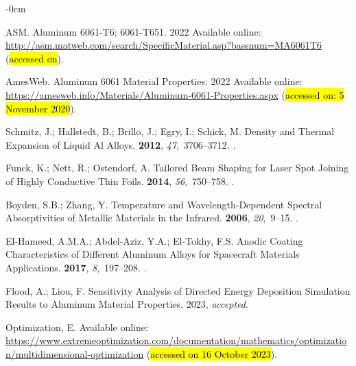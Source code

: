 \documentclass[metals,article,accept,pdftex,moreauthors]{Definitions/mdpi}
\begin{document}
\begin{adjustwidth}{-\extralength}{0cm}
\begin{thebibliography}{999}
ASM.
Aluminum 6061-{{T6}}; 6061-{{T651}}. 2022
Available online: \url{http://asm.matweb.com/search/SpecificMaterial.asp?bassnum=MA6061T6} (\hl{accessed on}).

AmesWeb.
Aluminum 6061 Material Properties. 2022
Available online: \url{https://amesweb.info/Materials/Aluminum-6061-Properties.aspx} (\hl{accessed on: 5 November 2020}).

Schmitz, J.; Hallstedt, B.; Brillo, J.; Egry, I.; Schick, M.
Density and Thermal Expansion of Liquid {{Al}} Alloys.
 {\bf 2012}, {\em 47},~3706--3712.
.

Funck, K.; Nett, R.; Ostendorf, A.
\newblock Tailored {{Beam Shaping}} for {{Laser Spot Joining}} of {{Highly
  Conductive Thin Foils}}.
 {\bf 2014}, {\em 56},~750--758.
.

Boyden, S.B.; Zhang, Y.
\newblock Temperature and {{Wavelength-Dependent Spectral Absorptivities}} of
  {{Metallic Materials}} in the {{Infrared}}.
 {\bf 2006}, {\em
  20},~9--15.
.

{El-Hameed}, A.M.A.; {Abdel-Aziz}, Y.A.; {El-Tokhy}, F.S.
\newblock Anodic {{Coating Characteristics}} of {{Different Aluminum Alloys}}
  for {{Spacecraft Materials Applications}}.
 {\bf 2017}, {\em 8},~197--208.
.

Flood, A.; Liou, F.
\newblock Sensitivity {{Analysis}} of {{Directed Energy Deposition Simulation
  Results}} to {{Aluminum Material Properties}}.
 2023, {\em  accepted}.

Optimization, E. Available online: \url{https://www.extremeoptimization.com/documentation/mathematics/optimization/multidimensional-optimization} (\hl{accessed on 16 October 2023}).


\end{thebibliography}
\end{adjustwidth}
\end{document}
